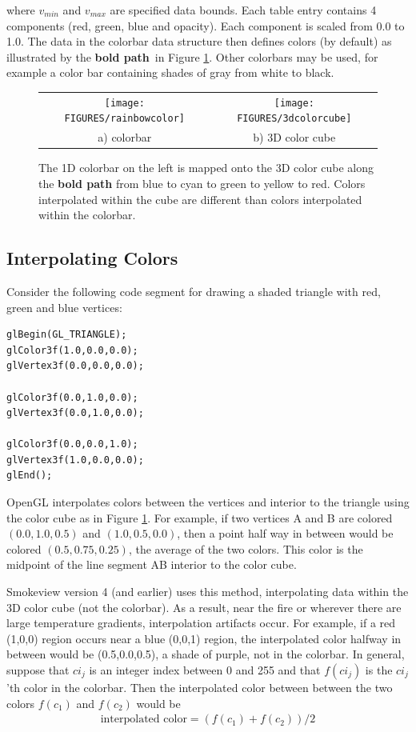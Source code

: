 \documentclass[11pt,twoside]{book}
\begin{document}
\noindent where $v_{min}$ and $v_{max}$ are specified data bounds.  Each table entry contains 4 components (red, green, blue and opacity).  Each component is scaled from 0.0 to 1.0.  The data in the colorbar data structure then defines colors (by default) as illustrated by the {\bf bold path}\ in Figure \ref{colorbarinfo}.  Other colorbars may be used, for example a color bar containing shades of gray from white to black.


\begin{figure}[\figoptions]
\begin{center}
\begin{tabular}{cc}
\texttt{[image: FIGURES/rainbowcolor]}&\texttt{[image: FIGURES/3dcolorcube]}\\
a) colorbar&b) 3D color cube\\
\end{tabular}
\end{center}
\caption[1D colorbar and 3D color cube]{The 1D colorbar on the left is mapped onto the 3D color cube
along the {\bf bold path} from blue to cyan to green to yellow to red.  Colors interpolated within the cube are different than colors interpolated within the colorbar.}
\label{colorbarinfo}%
\end{figure}

\subsection{Interpolating Colors}

Consider the following code segment for drawing a shaded triangle with red, green and blue vertices:
\begin{lstlisting}
glBegin(GL_TRIANGLE);
glColor3f(1.0,0.0,0.0);
glVertex3f(0.0,0.0,0.0);

glColor3f(0.0,1.0,0.0);
glVertex3f(0.0,1.0,0.0);

glColor3f(0.0,0.0,1.0);
glVertex3f(1.0,0.0,0.0);
glEnd();
\end{lstlisting}

OpenGL interpolates colors between the vertices and interior to
the triangle using the color cube as in Figure \ref{colorbarinfo}.
For example, if two vertices A and B are colored $(0.0,1.0,0.5)$
and $(1.0,0.5,0.0)$, then a point half way in between would be
colored $(0.5,0.75,0.25)$, the average of the two colors.  This
color is the midpoint of the line segment AB interior to the color
cube.

Smokeview version 4 (and earlier) uses this method, interpolating
data within the 3D color cube (not the colorbar).  As a result,
near the fire or wherever there are large temperature gradients,
interpolation artifacts occur.  For example, if a red (1,0,0)
region occurs near a blue (0,0,1) region, the interpolated color
halfway in between would be (0.5,0.0,0.5), a shade of purple, not
in the colorbar.  In general, suppose that $ci_j$ is an integer
index between 0 and 255 and that $f(ci_j)$ is the $ci_j$'th color
in the colorbar.  Then the interpolated color between between the
two colors $f(c_1)$ and $f(c_2)$ would be
\begin{eqnarray}
\mbox{interpolated color}=(f(c_1)+f(c_2))/2
\end{eqnarray}
\end{document}
